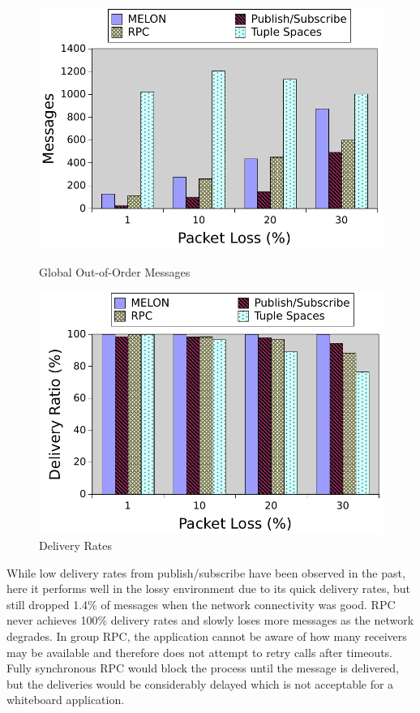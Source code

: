 \documentclass{llncs}
\begin{document}
\begin{figure}[ht]
\centering
\begin{minipage}[b]{0.48\linewidth}
\includegraphics[width = \textwidth]{figures/gooo.pdf}
\caption{Global Out-of-Order Messages}
\label{fig:gooo}
\end{minipage}
\quad
\begin{minipage}[b]{0.48\linewidth}
\includegraphics[width = \textwidth]{figures/delivery.pdf}
\caption{Delivery Rates}
\label{fig:delivery}
\end{minipage}
\end{figure}


While low delivery rates from publish/subscribe have been observed in the past\cite{collins2010quantitative}, here it performs well in the lossy environment due to its quick delivery rates, but still dropped 1.4\% of messages when the network connectivity was good. RPC never achieves 100\% delivery rates and slowly loses more messages as the network degrades. In group RPC, the application cannot be aware of how many receivers may be available and therefore does not attempt to retry calls after timeouts. Fully synchronous RPC would block the process until the message is delivered, but the deliveries would be considerably delayed which is not acceptable for a whiteboard application.
\end{document}
